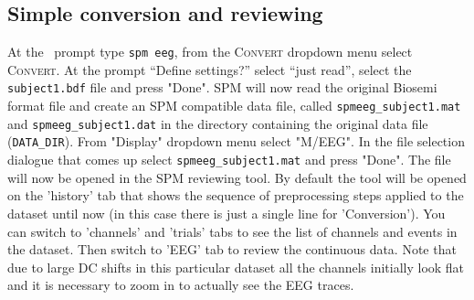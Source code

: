 \subsection{Simple conversion and reviewing}

At the \matlab\ prompt type \texttt{spm eeg}, from the \textsc{Convert} dropdown menu  select \textsc{Convert}. At the prompt ``Define settings?'' select ``just read'',  select the \texttt{subject1.bdf} file and press "Done". SPM will now read the original Biosemi format file and create an SPM compatible data file, called \texttt{spmeeg\_subject1.mat} and \texttt{spmeeg\_subject1.dat} in the directory containing the original data file (\texttt{DATA\_DIR}). From "Display" dropdown menu select "M/EEG". In the file selection dialogue that comes up select \texttt{spmeeg\_subject1.mat} and press "Done". The file will now be opened in the SPM reviewing tool. By default the tool will be opened on the 'history' tab that shows the sequence of preprocessing steps applied to the dataset until now (in this case there is just a single line for 'Conversion'). You can switch to 'channels' and 'trials' tabs to see the list of channels and events in  the dataset. Then switch to 'EEG' tab to review the continuous data. Note that due to large DC shifts in this particular dataset all the channels initially look flat and it is necessary to zoom in to actually see the EEG traces.

